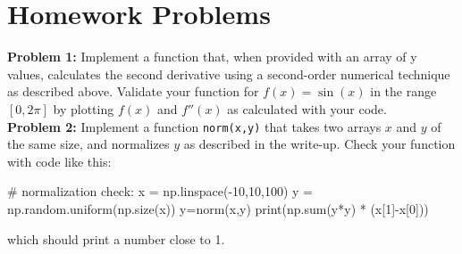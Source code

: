 \documentclass[12pt]{article}
\begin{document}



\section{Homework Problems}

\noindent
{\bf Problem 1:}  Implement a function that, when provided with an array of y values, calculates the second derivative using a second-order numerical technique as described above.  Validate your function for $f(x) = \sin(x)$ in the range $[0,2\pi]$ by plotting $f(x)$ and $f''(x)$ as calculated with your code.\\[5pt]

\noindent
{\bf Problem 2:}  Implement a function {\tt norm(x,y)} that takes two arrays $x$ and $y$ of the same size, and normalizes $y$ as described in the write-up.  Check your function with code like this:
\begin{python}
# normalization check:
x = np.linspace(-10,10,100)
y = np.random.uniform(np.size(x))
y=norm(x,y)
print(np.sum(y*y) * (x[1]-x[0]))
\end{python}
which should print a number close to 1.\\[5pt]
\end{document}
